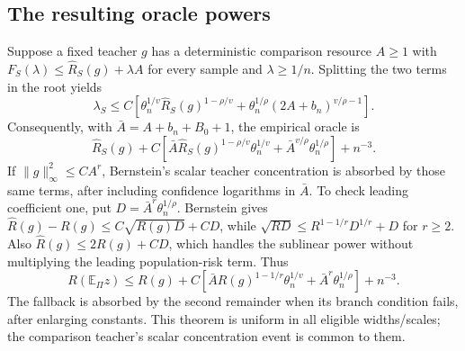 \subsection{The resulting oracle powers}
Suppose a fixed teacher $g$ has a deterministic comparison resource
$A\ge1$ with
$F_S(\lambda)\le\widehat R_S(g)+\lambda A$ for every sample and
$\lambda\ge1/n$. Splitting the two terms in the root yields
\[
 \lambda_S\le C\left[
 \theta_n^{1/v}\widehat R_S(g)^{1-\rho/v}
 +\theta_n^{1/\rho}(2A+b_n)^{v/\rho-1}\right].
\]
Consequently, with $\bar A=A+b_n+B_0+1$, the empirical oracle is
\[
 \widehat R_S(g)+C\left[
 \bar A\widehat R_S(g)^{1-\rho/v}\theta_n^{1/v}
 +\bar A^{v/\rho}\theta_n^{1/\rho}\right]+n^{-3}.
\]
If $\|g\|_\infty^2\le C A^r$, Bernstein's scalar
teacher concentration is absorbed by those same terms, after including
confidence logarithms in $\bar A$. To check leading coefficient one,
put $D=\bar A^r\theta_n^{1/\rho}$. Bernstein gives
$\widehat R(g)-R(g)\le C\sqrt{R(g)D}+CD$, while
$\sqrt{RD}\le R^{1-1/r}D^{1/r}+D$ for $r\ge2$.
Also $\widehat R(g)\le2R(g)+CD$, which handles the sublinear power
without multiplying the leading population-risk term. Thus
\begin{equation}
 R(\mathbb E_\Pi z)\le R(g)+C\left[
 \bar A R(g)^{1-1/r}\theta_n^{1/v}
 +\bar A^r\theta_n^{1/\rho}\right]+n^{-3}.
 \label{eq:localized-population-oracle}
\end{equation}
The fallback is absorbed by the second remainder when its branch
condition fails, after enlarging constants. This theorem is uniform in
all eligible widths/scales; the comparison teacher's scalar
concentration event is common to them.

